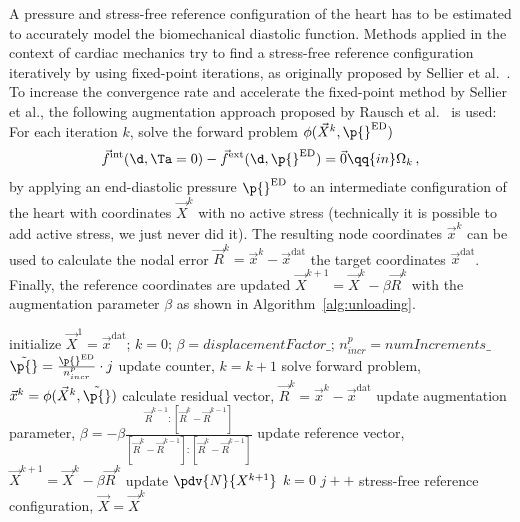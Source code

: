 A pressure and stress-free reference configuration of the heart has to be estimated to accurately model the biomechanical diastolic function.
Methods applied in the context of cardiac mechanics try to find a stress-free reference configuration iteratively by using fixed-point iterations, as originally proposed by Sellier et al.~\cite{Sellier-2011-ID12486}.
To increase the convergence rate and accelerate the fixed-point method by Sellier et al., the following augmentation approach  proposed by Rausch et al.~\cite{Rausch-2017} is used:
For each iteration $k$, solve the forward problem $\phi(\vec X^k, \p{}^\mathrm{ED})$
\begin{align}
\vec f^\mathrm{int}(\d, \Ta = 0) - \vec f^\mathrm{ext}(\d, \p{}^\mathrm{ED})  = \vec 0 \qq{in} \Omega_k \,, \label{eq:forwardMechanics}
\end{align}
by applying an end-diastolic pressure $\p{}^\mathrm{ED}$ to an intermediate configuration of the heart with coordinates $\vec X^k$ with no active stress (technically it is possible to add active stress, we just never did it).
The resulting node coordinates $\vec x^k$ can be used to calculate the nodal error $\vec R^k = \vec x^k - \vec x^\mathrm{dat}$ \wrt the target coordinates $\vec x^\mathrm{dat}$.
Finally, the reference coordinates are updated $\vec X^{k+1} = \vec X^k - \beta \vec R^k$ with the augmentation parameter $\beta$ as shown in Algorithm~\ref{alg:unloading}.
\begin{algorithm}
\caption{Reference configuration recovery }\label{alg:unloading}
\begin{algorithmic}[1]
\State initialize $\vec X^1 = \vec x^\mathrm{dat}$; $k = 0$; $\beta = displacementFactor\_$; $n^p_{incr} = numIncrements\_$
\State $\Tilde{\p{}} = \frac{\p{}^\mathrm{ED}}{n^p_{incr}} \cdot j$
\State update counter, $k = k + 1$
\State solve forward problem, $\vec x^k = \phi(\vec X^k,\Tilde{\p{}})$
\State calculate residual vector, $\vec R^k = \vec x^k - \vec x^\mathrm{dat}$
\State update augmentation parameter, $\beta = - \beta \frac{\vec R^{k-1} \colon [\vec R^k - \vec R^{k-1}]}{[\vec R^k - \vec R^{k-1}]\colon [\vec R^k - \vec R^{k-1}]}$
\EndIf
\State update reference vector, $\vec X^{k+1} = \vec X^k - \beta \vec R^k$
\State update $\pdv{N}{X^{k+1}}$
\EndWhile
\State $k = 0$
\State $j++$
\EndFor
\State\Return stress-free reference configuration, $\vec X = \vec X^k$
\EndProcedure
\end{algorithmic}
\end{algorithm}
